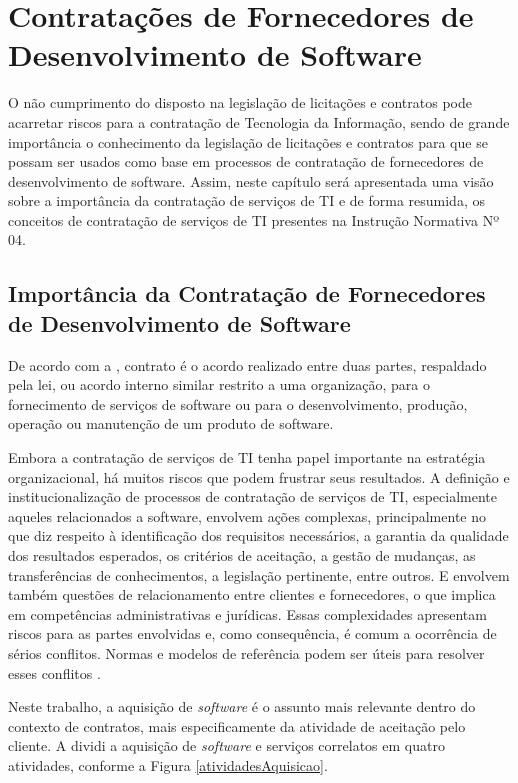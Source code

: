 \chapter{Contratações de Fornecedores de Desenvolvimento de Software}
\label{chap:contratos}

O não cumprimento do disposto na legislação de licitações e contratos pode acarretar riscos para a contratação de Tecnologia da Informação, sendo de grande importância o conhecimento da legislação de licitações e contratos para que se possam ser usados como base em processos de contratação de fornecedores de desenvolvimento de software.
Assim, neste capítulo será apresentada uma visão sobre a importância da contratação de
serviços de TI e de forma resumida, os conceitos de contratação de serviços de TI presentes na Instrução Normativa Nº 04.

\section{Importância da Contratação de Fornecedores de Desenvolvimento de Software}

De acordo com a , contrato é o acordo realizado entre duas partes, respaldado pela lei, ou acordo interno similar restrito a uma organização, para o fornecimento de serviços de software ou para o desenvolvimento, produção, operação ou manutenção de um produto de software.

Embora a contratação de serviços de TI tenha papel importante na estratégia organizacional, há muitos riscos que podem frustrar seus resultados. A definição e institucionalização de processos de contratação de serviços de TI, especialmente aqueles relacionados a software, envolvem ações complexas, principalmente no que diz respeito à identificação dos requisitos necessários, a garantia da qualidade dos resultados esperados, os critérios de aceitação, a gestão de mudanças, as transferências de conhecimentos, a legislação pertinente, entre outros. E envolvem também questões de relacionamento entre clientes e fornecedores, o que implica em competências administrativas e jurídicas. Essas complexidades apresentam riscos para as partes envolvidas e, como consequência, é comum a ocorrência de sérios conflitos. Normas e modelos de referência podem ser úteis para resolver esses conflitos \cite{processoContratacao}.

Neste trabalho, a aquisição de \textit{software} é o assunto mais relevante dentro do contexto de contratos,  mais especificamente da atividade de aceitação pelo cliente. A \cite{ISO:12207} dividi a aquisição de \textit{software} e serviços correlatos em quatro atividades, conforme a Figura \ref{atividadesAquisicao}.



